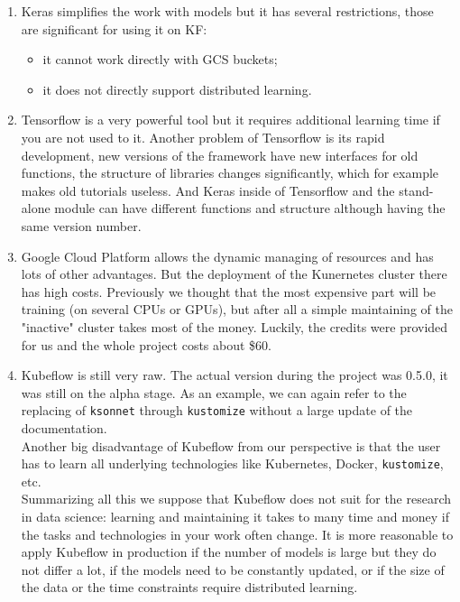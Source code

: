 \documentclass[
	12pt, %
]{fphw}
\begin{document}
\begin{enumerate}
	\item Keras simplifies the work with models but it has several restrictions, those are significant for using it on KF: 
	\begin{itemize}
		\item it cannot work directly with GCS buckets;
		\item it does not directly support distributed learning.
	\end{itemize}
	 \item Tensorflow is a very powerful tool but it requires additional learning time if you are not used to it. Another problem of Tensorflow is its rapid development, new versions of the framework have new interfaces for old functions, the structure of libraries changes significantly, which for example makes old tutorials useless. And Keras inside of Tensorflow and the stand-alone module can have different functions and structure although having the same version number.
	 \item Google Cloud Platform allows the dynamic managing of resources and has lots of other advantages. But the deployment of the Kunernetes cluster there has high costs. Previously we thought that the most expensive part will be training (on several CPUs or GPUs), but after all a simple maintaining of the "inactive" cluster takes most of the money. Luckily, the credits were provided for us and the whole project costs about \$60.
	 \item Kubeflow is still very raw. The actual version during the project was 0.5.0, it was still on the alpha stage. As an example, we can again refer to the replacing of \verb|ksonnet| through \verb|kustomize| without a large update of the documentation.\\
	 Another big disadvantage of Kubeflow from our perspective is that the user has to learn all underlying technologies like Kubernetes, Docker, \verb|kustomize|, etc.\\
	 Summarizing all this we suppose that Kubeflow does not suit for the research in data science: learning and maintaining it takes to many time and money if the tasks and technologies in your work often change. It is more reasonable to apply Kubeflow in production if the number of models is large but they do not differ a lot, if the models need to be constantly updated, or if the size of the data or the time constraints require distributed learning.
 \end{enumerate}
\end{document}
